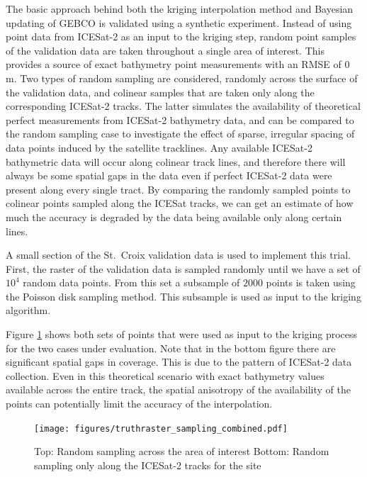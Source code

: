 The basic approach behind both the kriging interpolation method and Bayesian updating of GEBCO is validated using a synthetic experiment. Instead of using point data from ICESat-2 as an input to the kriging step, random point samples of the validation data are taken throughout a single area of interest. This provides a source of exact bathymetry point measurements with an RMSE of 0 m. Two types of random sampling are considered, randomly across the surface of the validation data, and colinear samples that are taken only along the corresponding ICESat-2 tracks. The latter simulates the availability of theoretical perfect measurements from ICESat-2 bathymetry data, and can be compared to the random sampling case to investigate the effect of sparse, irregular spacing of data points induced by the satellite tracklines. Any available ICESat-2 bathymetric data will occur along colinear track lines, and therefore there will always be some spatial gaps in the data even if perfect ICESat-2 data were present along every single tract. By comparing the randomly sampled points to colinear points sampled along the ICESat tracks, we can get an estimate of how much the accuracy is degraded by the data being available only along certain lines.

A small section of the St.~Croix validation data is used to implement this trial. First, the raster of the validation data is sampled randomly until we have a set of $10^4$ random data points. From this set a subsample of $2000$ points is taken using the Poisson disk sampling method. This subsample is used as input to the kriging algorithm.

Figure \ref{fig:truthras-sampling} shows both sets of points that were used as input to the kriging process for the two cases under evaluation. Note that in the bottom figure there are significant spatial gaps in coverage. This is due to the pattern of ICESat-2 data collection. Even in this theoretical scenario with exact bathymetry values available across the entire track, the spatial anisotropy of the availability of the points can potentially limit the accuracy of the interpolation.

\begin{figure}[h]
    \centering
    \texttt{[image: figures/truthraster\_sampling\_combined.pdf]}
    \caption[Random sampling points for validation test]{Top: Random sampling across the area of interest \newline  Bottom: Random sampling only along the ICESat-2 tracks for the site}
    \label{fig:truthras-sampling}
\end{figure}

